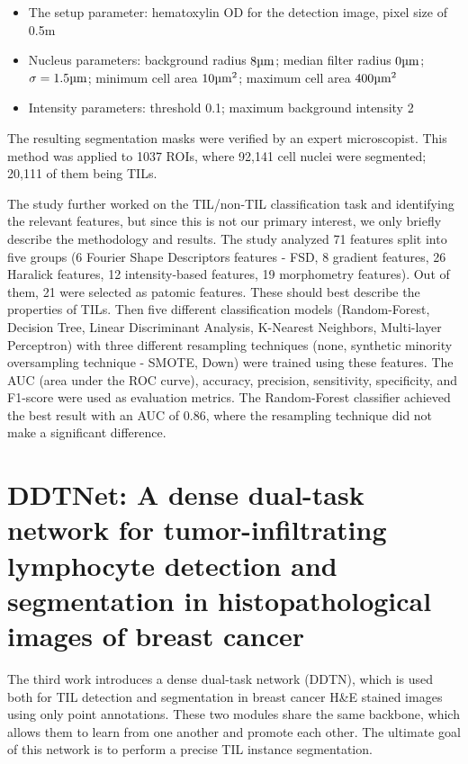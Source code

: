 \begin{itemize}
    \item The setup parameter: hematoxylin OD for the detection image, pixel size of 0.5\textmu m
    \item Nucleus parameters: background radius $8 \text{\textmu m}$; median filter radius $0 \text{\textmu m}$; $\sigma = 1.5 \text{\textmu m}$; minimum cell area $10 \text{\textmu m}^2$; maximum cell area $400 \text{\textmu m}^2$
    \item Intensity parameters: threshold 0.1; maximum background intensity 2
\end{itemize}

The resulting segmentation masks were verified by an expert microscopist. This method was applied to 1037 ROIs, where 92,141 cell nuclei were segmented; 20,111 of them being TILs.

The study further worked on the TIL/non-TIL classification task and identifying the relevant features, but since this is not our primary interest, we only briefly describe the methodology and results. The study analyzed 71 features split into five groups (6 Fourier Shape Descriptors features - FSD, 8 gradient features, 26 Haralick features, 12 intensity-based features, 19 morphometry features). Out of them, 21 were selected as patomic features. These should best describe the properties of TILs. Then five different classification models (Random-Forest, Decision Tree, Linear Discriminant Analysis, K-Nearest Neighbors, Multi-layer Perceptron) with three different resampling techniques (none, synthetic minority oversampling technique - SMOTE, Down) were trained using these features. The AUC (area under the ROC curve), accuracy, precision, sensitivity, specificity, and F1-score were used as evaluation metrics. The Random-Forest classifier achieved the best result with an AUC of 0.86, where the resampling technique did not make a significant difference.

\section{DDTNet: A dense dual-task network for tumor-infiltrating lymphocyte detection and segmentation in histopathological images of breast cancer \cite{Zhang2022}}
The third work introduces a dense dual-task network (DDTN), which is used both for TIL detection and segmentation in breast cancer H\&E stained images using only point annotations. These two modules share the same backbone, which allows them to learn from one another and promote each other. The ultimate goal of this network is to perform a precise TIL instance segmentation.

